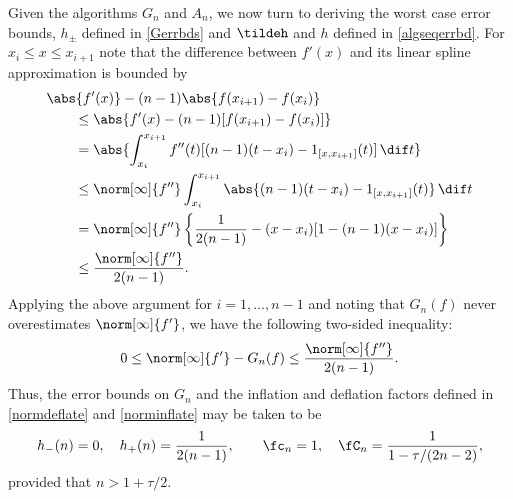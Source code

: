 Given the algorithms $G_n$ and $A_n$, we now turn to deriving the worst case error bounds, $h_{\pm}$ defined in \eqref{Gerrbds} and $\tildeh$ and $h$ defined in \eqref{algseqerrbd}.  For $x_{i} \le x \le x_{i+1}$ note that the difference between $f'(x)$ and its linear spline approximation is bounded by
\begin{align*}
\MoveEqLeft{\abs{f'(x)} - (n-1) \abs{f(x_{i+1})-f(x_i)}} \\
 & \le \abs{f'(x) - (n-1)[f(x_{i+1})-f(x_i)]} \\
&=\abs{ \int_{x_i}^{x_{i+1}} f''(t) [(n-1)(t-x_i) -  1_{[x,x_{i+1}]}(t)] \, \dif t} \\
& \le \norm[\infty]{f''} \int_{x_i}^{x_{i+1}} \abs{  (n-1)(t-x_i) -  1_{[x,x_{i+1}]}(t)} \, \dif t \\
&=\norm[\infty]{f''} \left \{\frac{1}{2(n-1)} - (x-x_i)[1-(n-1)(x-x_i)] \right\} \\
&\le \frac{\norm[\infty]{f''}}{2(n-1)}.
\end{align*}
Applying the above argument for $i=1, \ldots, n-1$ and noting that $G_n(f)$ never overestimates $\norm[\infty]{f'}$, we have the following two-sided inequality:
\[
0 \le \norm[\infty]{f'} - G_n(f) \le \frac{\norm[\infty]{f''}}{2(n-1)}.
\]
Thus, the error bounds on $G_n$ and the inflation and deflation factors defined in  \eqref{normdeflate} and \eqref{norminflate} may be taken to be
\begin{equation}\label{inflaapprox}
 h_{-}(n)=0, \quad h_{+}(n)=\frac{1}{2(n-1)}, \qquad \fc_n=1, \quad   \fC_n =\frac{1}{1 - \tau /(2n-2)},
\end{equation}
provided that $n>1+\tau/2$.

